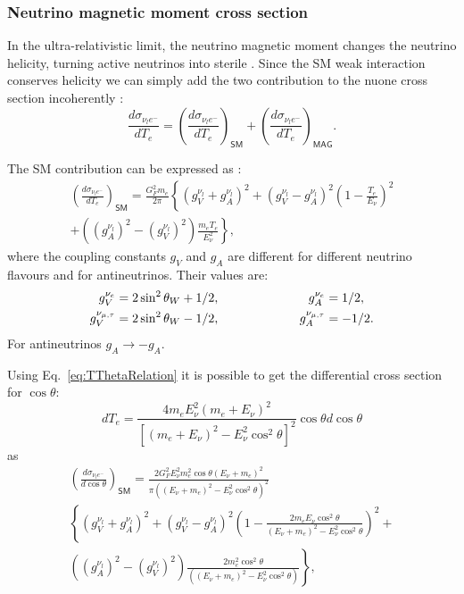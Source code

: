 \subsubsection{Neutrino magnetic moment cross section}
In the ultra-relativistic limit, the neutrino magnetic moment changes the neutrino helicity, turning active neutrinos into sterile . Since the \gls{SM} weak interaction conserves helicity we can simply add the two contribution to the \gls{nuone} cross section incoherently \cite{nuElmagInt2015.pdf}:
\begin{equation}
\frac{d\sigma_{\nu_le^-}}{dT_e}=\left(\frac{d\sigma_{\nu_le^-}}{dT_e}\right)_{\textsf{SM}}+\left(\frac{d\sigma_{\nu_le^-}}{dT_e}\right)_{\textsf{MAG}}.
\end{equation}

The \gls{SM} contribution can be expressed as \cite{nuElmagInt2015.pdf}:
\begin{multline}
\left(\frac{d\sigma_{\nu_le^-}}{dT_e}\right)_{\textsf{SM}}=\frac{G_F^2m_e}{2\pi}\left\lbrace\left(g_V^{\nu_l}+g_A^{\nu_l}\right)^2+\left(g_V^{\nu_l}-g_A^{\nu_l}\right)^2\left(1-\frac{T_e}{E_{\nu}}\right)^2\right.\\
+\left.\left(\left(g_A^{\nu_l}\right)^2-\left(g_V^{\nu_l}\right)^2\right)\frac{m_eT_e}{E_{\nu}^2}\right\rbrace,
\end{multline}
where the coupling constants $g_V$ and $g_A$ are different for different neutrino flavours and for antineutrinos. Their values are:
\begin{align}
g_V^{\nu_e}&=2\sin^2\theta_W+1/2,\hspace{2.5cm} g_A^{\nu_e}=1/2,\\
g_V^{\nu_{\mu,\tau}}&=2\sin^2\theta_W-1/2,\hspace{2.25cm} g_A^{\nu_{\mu,\tau}}=-1/2.
\end{align}
For antineutrinos $g_A\rightarrow -g_A$.

Using Eq.~\ref{eq:TThetaRelation} it is possible to get the differential cross section for $\cos\theta$:
\begin{equation}
dT_e=\frac{4m_eE_\nu^2\left(m_e+E_\nu\right)^2}{\left[\left(m_e+E_\nu\right)^2-E_\nu^2\cos^2\theta\right]^2}\cos\theta d\cos\theta
\end{equation}
as
\begin{multline}
\left(\frac{d\sigma_{\nu_le^-}}{d\cos\theta}\right)_{\textsf{SM}}=
\frac{2G_F^2E_{\nu}^2m_e^2\cos\theta\left(E_{\nu}+m_e\right)^2}{\pi\left(\left(E_{\nu}+m_e\right)^2-E_{\nu}^2\cos^2\theta\right)^2}\\
\left\lbrace\left(g_V^{\nu_l}+g_A^{\nu_l}\right)^2+
\left(g_V^{\nu_l}-g_A^{\nu_l}\right)^2\left(1-\frac{2m_eE_{\nu}\cos^2\theta}{\left(E_{\nu}+m_e\right)^2-E_{\nu}^2\cos^2\theta}\right)^2\right.+\\
\left.\left(\left(g_A^{\nu_l}\right)^2-\left(g_V^{\nu_l}\right)^2\right)
\frac{2m_e^2\cos^2\theta}{\left(\left(E_{\nu}+m_e\right)^2-E_{\nu}^2\cos^2\theta\right)}\right\rbrace,
\end{multline}

